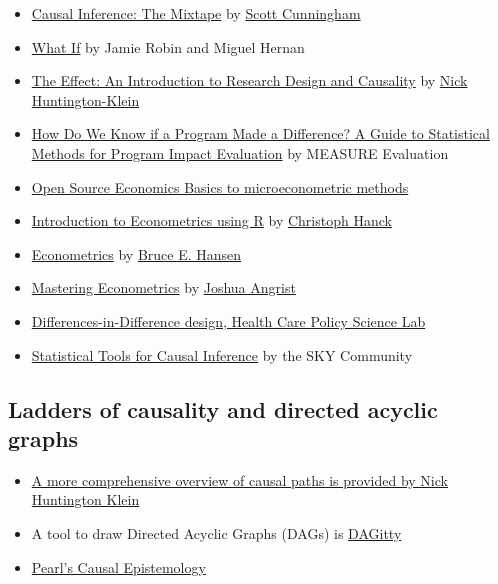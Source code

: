 \documentclass[
]{book}
\providecommand{\tightlist}{%
  \setlength{\itemsep}{0pt}\setlength{\parskip}{0pt}}
\begin{document}
\begin{itemize}
\tightlist
\item
  \href{https://mixtape.scunning.com/}{Causal Inference: The Mixtape} by
  \href{http://www.scunning.com/}{Scott Cunningham}
\item
  \href{https://www.hsph.harvard.edu/miguel-hernan/causal-inference-book/}{What
  If} by Jamie Robin and Miguel Hernan
\item
  \href{http://nickchk.com/causalitybook.html}{The Effect: An
  Introduction to Research Design and Causality} by
  \href{http://nickchk.com/}{Nick Huntington-Klein}
\item
  \href{https://www.measureevaluation.org/resources/publications/ms-14-87-en.html}{How
  Do We Know if a Program Made a Difference? A Guide to Statistical
  Methods for Program Impact Evaluation} by MEASURE Evaluation
\item
  \href{https://ose-data-science.readthedocs.io/en/latest/lectures/index.html}{Open
  Source Economics Basics to microeconometric methods}
\item
  \href{https://www.econometrics-with-r.org/}{Introduction to
  Econometrics using R} by
  \href{https://www.oek.wiwi.uni-due.de/en/team/christoph-hanck/}{Christoph
  Hanck}
\item
  \href{https://www.ssc.wisc.edu/~bhansen/econometrics/}{Econometrics}
  by \href{https://www.ssc.wisc.edu/~bhansen/}{Bruce E. Hansen}
\item
  \href{https://mru.org/mastering-econometrics}{Mastering Econometrics}
  by \href{https://economics.mit.edu/faculty/angrist}{Joshua Angrist}
\item
  \href{https://diff.healthpolicydatascience.org/}{Differences-in-Difference
  design, Health Care Policy Science Lab}
\item
  \href{https://chabefer.github.io/STCI/}{Statistical Tools for Causal
  Inference} by the SKY Community
\end{itemize}

\hypertarget{ladders-of-causality-and-directed-acyclic-graphs}{%
\subsection{Ladders of causality and directed acyclic
graphs}\label{ladders-of-causality-and-directed-acyclic-graphs}}

\begin{itemize}
\tightlist
\item
  \href{https://theeffectbook.net/ch-CausalPaths.html}{A more
  comprehensive overview of causal paths is provided by Nick Huntington
  Klein}
\item
  A tool to draw Directed Acyclic Graphs (DAGs) is
  \href{http://www.dagitty.net/}{DAGitty}
\item
  \href{https://twitter.com/soboleffspaces/status/1491938765408931841?s=20\&t=RN_Ygh-E06bEt9uqf0Dgvw}{Pearl's
  Causal Epistemology}
\end{itemize}
\end{document}
